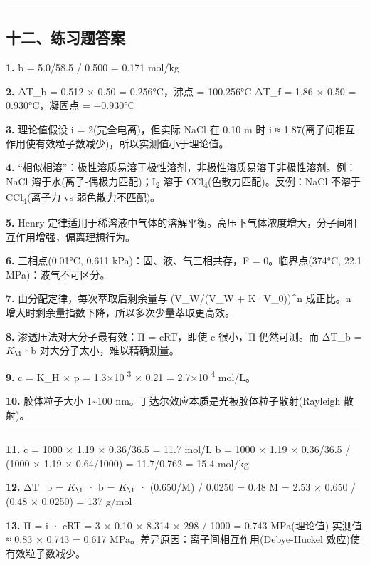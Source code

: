 \documentclass[a4paper,11pt]{ctexart}
\begin{document}
\begin{center}\rule{0.5\linewidth}{0.5pt}\end{center}

\subsection{十二、练习题答案}\label{ux5341ux4e8cux7ec3ux4e60ux9898ux7b54ux6848}

\textbf{1.} b = 5.0/58.5 / 0.500 = 0.171 mol/kg

\textbf{2.} ΔT\_b = 0.512 × 0.50 = 0.256°C，沸点 = 100.256°C
ΔT\_f = 1.86 × 0.50 = 0.930°C，凝固点 = −0.930°C

\textbf{3.} 理论值假设 i = 2(完全电离)，但实际 NaCl 在 0.10 m 时 i ≈ 1.87(离子间相互作用使有效粒子数减少)，所以实测值小于理论值。

\textbf{4.} ``相似相溶''：极性溶质易溶于极性溶剂，非极性溶质易溶于非极性溶剂。例：NaCl 溶于水(离子-偶极力匹配)；I\textsubscript{2} 溶于 CCl\textsubscript{4}(色散力匹配)。反例：NaCl 不溶于 CCl\textsubscript{4}(离子力 vs 弱色散力不匹配)。

\textbf{5.} Henry 定律适用于稀溶液中气体的溶解平衡。高压下气体浓度增大，分子间相互作用增强，偏离理想行为。

\textbf{6.} 三相点(0.01°C, 0.611 kPa)：固、液、气三相共存，F = 0。临界点(374°C, 22.1 MPa)：液气不可区分。

\textbf{7.} 由分配定律，每次萃取后剩余量与 (V\_W/(V\_W + K·V\_0))\^{}n 成正比。n 增大时剩余量指数下降，所以多次少量萃取更高效。

\textbf{8.} 渗透压法对大分子最有效：Π = cRT，即使 c 很小，Π 仍然可测。而 ΔT\_b = \(K_{\1}\)·b 对大分子太小，难以精确测量。

\textbf{9.} c = K\_H × p = 1.3×10\textsuperscript{-3} × 0.21 = 2.7×10\textsuperscript{-4} mol/L。

\textbf{10.} 胶体粒子大小 1\textasciitilde100 nm。丁达尔效应本质是光被胶体粒子散射(Rayleigh 散射)。

\begin{center}\rule{0.5\linewidth}{0.5pt}\end{center}

\textbf{11.} c = 1000 × 1.19 × 0.36/36.5 = 11.7 mol/L
b = 1000 × 1.19 × 0.36/36.5 / (1000 × 1.19 × 0.64/1000) = 11.7/0.762 = 15.4 mol/kg

\textbf{12.} ΔT\_b = \(K_{\1}\) · b = \(K_{\1}\) · (0.650/M) / 0.0250 = 0.48
M = 2.53 × 0.650 / (0.48 × 0.0250) = 137 g/mol

\textbf{13.} Π = i · cRT = 3 × 0.10 × 8.314 × 298 / 1000 = 0.743 MPa(理论值)
实测值 ≈ 0.83 × 0.743 = 0.617 MPa。差异原因：离子间相互作用(Debye-Hückel 效应)使有效粒子数减少。
\end{document}

